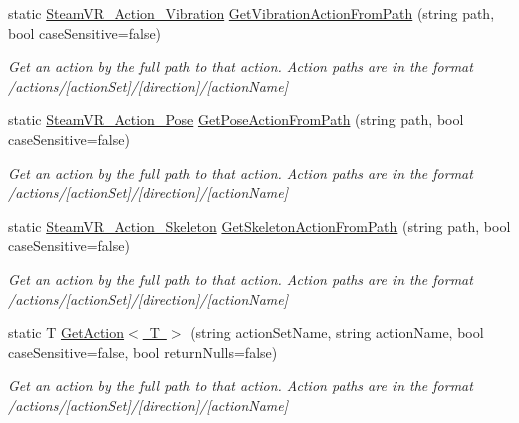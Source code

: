 \begin{DoxyCompactItemize}
static \mbox{\hyperlink{class_valve_1_1_v_r_1_1_steam_v_r___action___vibration}{Steam\+V\+R\+\_\+\+Action\+\_\+\+Vibration}} \mbox{\hyperlink{class_valve_1_1_v_r_1_1_steam_v_r___input_ad17ec850cff6999077412a0a2a09c317}{Get\+Vibration\+Action\+From\+Path}} (string path, bool case\+Sensitive=false)
\begin{DoxyCompactList}\small\item\em Get an action by the full path to that action. Action paths are in the format /actions/\mbox{[}action\+Set\mbox{]}/\mbox{[}direction\mbox{]}/\mbox{[}action\+Name\mbox{]} \end{DoxyCompactList}\item 
static \mbox{\hyperlink{class_valve_1_1_v_r_1_1_steam_v_r___action___pose}{Steam\+V\+R\+\_\+\+Action\+\_\+\+Pose}} \mbox{\hyperlink{class_valve_1_1_v_r_1_1_steam_v_r___input_a5843e47aa0df15b89b76113dc191228d}{Get\+Pose\+Action\+From\+Path}} (string path, bool case\+Sensitive=false)
\begin{DoxyCompactList}\small\item\em Get an action by the full path to that action. Action paths are in the format /actions/\mbox{[}action\+Set\mbox{]}/\mbox{[}direction\mbox{]}/\mbox{[}action\+Name\mbox{]} \end{DoxyCompactList}\item 
static \mbox{\hyperlink{class_valve_1_1_v_r_1_1_steam_v_r___action___skeleton}{Steam\+V\+R\+\_\+\+Action\+\_\+\+Skeleton}} \mbox{\hyperlink{class_valve_1_1_v_r_1_1_steam_v_r___input_a43955478497bd79185e2e990b1fe43d8}{Get\+Skeleton\+Action\+From\+Path}} (string path, bool case\+Sensitive=false)
\begin{DoxyCompactList}\small\item\em Get an action by the full path to that action. Action paths are in the format /actions/\mbox{[}action\+Set\mbox{]}/\mbox{[}direction\mbox{]}/\mbox{[}action\+Name\mbox{]} \end{DoxyCompactList}\item 
static T \mbox{\hyperlink{class_valve_1_1_v_r_1_1_steam_v_r___input_acfe21ace1b5f5466da7849026be2eeff}{Get\+Action$<$ T $>$}} (string action\+Set\+Name, string action\+Name, bool case\+Sensitive=false, bool return\+Nulls=false)
\begin{DoxyCompactList}\small\item\em Get an action by the full path to that action. Action paths are in the format /actions/\mbox{[}action\+Set\mbox{]}/\mbox{[}direction\mbox{]}/\mbox{[}action\+Name\mbox{]} \end{DoxyCompactList}\item 

\end{DoxyCompactItemize}
